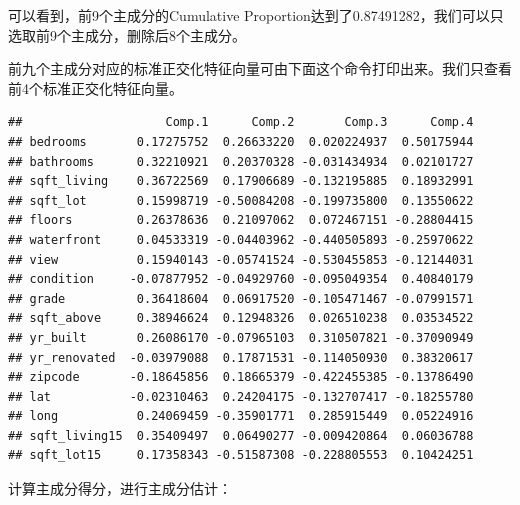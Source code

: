 \documentclass[]{article}
\newenvironment{Shaded}{\begin{snugshade}}{\end{snugshade}}
\newcommand{\KeywordTok}[1]{\textcolor[rgb]{0.13,0.29,0.53}{\textbf{#1}}}
\newcommand{\DataTypeTok}[1]{\textcolor[rgb]{0.13,0.29,0.53}{#1}}
\newcommand{\DecValTok}[1]{\textcolor[rgb]{0.00,0.00,0.81}{#1}}
\newcommand{\StringTok}[1]{\textcolor[rgb]{0.31,0.60,0.02}{#1}}
\newcommand{\OperatorTok}[1]{\textcolor[rgb]{0.81,0.36,0.00}{\textbf{#1}}}
\newcommand{\NormalTok}[1]{#1}
\begin{document}
可以看到，前9个主成分的Cumulative
Proportion达到了0.87491282，我们可以只选取前9个主成分，删除后8个主成分。

前九个主成分对应的标准正交化特征向量可由下面这个命令打印出来。我们只查看前4个标准正交化特征向量。

\begin{Shaded}
\end{Shaded}

\begin{verbatim}
##                    Comp.1      Comp.2       Comp.3      Comp.4
## bedrooms       0.17275752  0.26633220  0.020224937  0.50175944
## bathrooms      0.32210921  0.20370328 -0.031434934  0.02101727
## sqft_living    0.36722569  0.17906689 -0.132195885  0.18932991
## sqft_lot       0.15998719 -0.50084208 -0.199735800  0.13550622
## floors         0.26378636  0.21097062  0.072467151 -0.28804415
## waterfront     0.04533319 -0.04403962 -0.440505893 -0.25970622
## view           0.15940143 -0.05741524 -0.530455853 -0.12144031
## condition     -0.07877952 -0.04929760 -0.095049354  0.40840179
## grade          0.36418604  0.06917520 -0.105471467 -0.07991571
## sqft_above     0.38946624  0.12948326  0.026510238  0.03534522
## yr_built       0.26086170 -0.07965103  0.310507821 -0.37090949
## yr_renovated  -0.03979088  0.17871531 -0.114050930  0.38320617
## zipcode       -0.18645856  0.18665379 -0.422455385 -0.13786490
## lat           -0.02310463  0.24204175 -0.132707417 -0.18255780
## long           0.24069459 -0.35901771  0.285915449  0.05224916
## sqft_living15  0.35409497  0.06490277 -0.009420864  0.06036788
## sqft_lot15     0.17358343 -0.51587308 -0.228805553  0.10424251
\end{verbatim}

计算主成分得分，进行主成分估计：

\begin{Shaded}
\end{Shaded}
\end{document}
